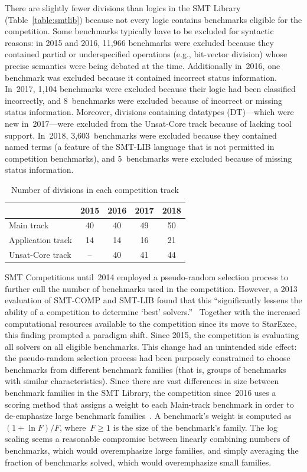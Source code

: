 \documentclass[dvipsnames,table,twoside,11pt]{article}
\begin{document}
There are slightly fewer divisions than logics in the SMT Library
(Table~\ref{table:smtlib}) because not every logic contains benchmarks
eligible for the competition.  Some benchmarks typically have to be
excluded for syntactic reasons: in 2015 and 2016, 11,966 benchmarks
were excluded because they contained partial or underspecified
operations (e.g., bit-vector division) whose precise semantics were
being debated at the time.  Additionally in~2016, one benchmark was
excluded because it contained incorrect status information.  In~2017,
1,104 benchmarks were excluded because their logic had been classified
incorrectly, and 8~benchmarks were excluded because of incorrect or
missing status information.  Moreover, divisions containing datatypes
({DT})---which were new in~2017---were excluded from the Unsat-Core
track because of lacking tool support.  In~2018, 3,603~benchmarks were
excluded because they contained named terms (a feature of the SMT-LIB
language that is not permitted in competition benchmarks), and
5~benchmarks were excluded because of missing status information.

\begin{table}
  \caption{Number of divisions in each competition track}
  \label{table:divisions}
  \centering
  \begin{tabular}{lcccc}
    \toprule
    & 2015 & 2016 & 2017 & 2018 \\
    \midrule
    Main track        &  40 & 40 & 49 & 50 \\
    Application track &  14 & 14 & 16 & 21 \\
    Unsat-Core track  &  -- & 40 & 41 & 44 \\
    \bottomrule
  \end{tabular}
\end{table}

SMT Competitions until~2014 employed a pseudo-random selection process
to further cull the number of benchmarks used in the competition.
However, a 2013 evaluation of SMT-COMP and SMT-LIB found that this
``significantly lessens the ability of a competition to determine
`best' solvers.''~\cite{CSW15} Together with the increased
computational resources available to the competition since its move to
StarExec, this finding prompted a paradigm shift.  Since 2015, the
competition is evaluating all solvers on all eligible benchmarks.
This change had an unintended side effect: the pseudo-random selection
process had been purposely constrained to choose benchmarks from
different benchmark families (that is, groups of benchmarks with
similar characteristics).  Since there are vast differences in size
between benchmark families in the SMT Library, the competition
since~2016 uses a scoring method that assigns a weight to each
Main-track benchmark in order to de-emphasize large benchmark
families~\cite{rules18}.  A benchmark's weight is computed as $(1 +
\ln F)/F$, where~$F\geq 1$ is the size of the benchmark's family.  The
log scaling seems a reasonable compromise between linearly combining
numbers of benchmarks, which would overemphasize large families, and
simply averaging the fraction of benchmarks solved, which would
overemphasize small families.
\end{document}
